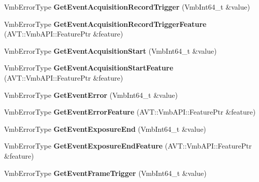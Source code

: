 \begin{DoxyCompactItemize}
\item 
\hypertarget{classMakoCamera_a5e005e9b7efd298aab3a61b2f86d52f3}{Vmb\-Error\-Type {\bfseries Get\-Event\-Acquisition\-Record\-Trigger} (Vmb\-Int64\-\_\-t \&value)}\label{classMakoCamera_a5e005e9b7efd298aab3a61b2f86d52f3}

\item 
\hypertarget{classMakoCamera_a84257ce541d40e3f17103f38a13dbd31}{Vmb\-Error\-Type {\bfseries Get\-Event\-Acquisition\-Record\-Trigger\-Feature} (A\-V\-T\-::\-Vmb\-A\-P\-I\-::\-Feature\-Ptr \&feature)}\label{classMakoCamera_a84257ce541d40e3f17103f38a13dbd31}

\item 
\hypertarget{classMakoCamera_a60fcd0d4942e67c91b2e11f1c16f6d3a}{Vmb\-Error\-Type {\bfseries Get\-Event\-Acquisition\-Start} (Vmb\-Int64\-\_\-t \&value)}\label{classMakoCamera_a60fcd0d4942e67c91b2e11f1c16f6d3a}

\item 
\hypertarget{classMakoCamera_ac1fc9e18c768b4626424d48f04ad92c7}{Vmb\-Error\-Type {\bfseries Get\-Event\-Acquisition\-Start\-Feature} (A\-V\-T\-::\-Vmb\-A\-P\-I\-::\-Feature\-Ptr \&feature)}\label{classMakoCamera_ac1fc9e18c768b4626424d48f04ad92c7}

\item 
\hypertarget{classMakoCamera_a1169f87cbb7c2e0df7f77acf304b6887}{Vmb\-Error\-Type {\bfseries Get\-Event\-Error} (Vmb\-Int64\-\_\-t \&value)}\label{classMakoCamera_a1169f87cbb7c2e0df7f77acf304b6887}

\item 
\hypertarget{classMakoCamera_a066c6295ca4fbbfb7ace4896ba3c8a82}{Vmb\-Error\-Type {\bfseries Get\-Event\-Error\-Feature} (A\-V\-T\-::\-Vmb\-A\-P\-I\-::\-Feature\-Ptr \&feature)}\label{classMakoCamera_a066c6295ca4fbbfb7ace4896ba3c8a82}

\item 
\hypertarget{classMakoCamera_a52b00ca70394a5f77e9427a3ee1ceb8b}{Vmb\-Error\-Type {\bfseries Get\-Event\-Exposure\-End} (Vmb\-Int64\-\_\-t \&value)}\label{classMakoCamera_a52b00ca70394a5f77e9427a3ee1ceb8b}

\item 
\hypertarget{classMakoCamera_a8e5f5406204eeb36b1992904a4f36ff3}{Vmb\-Error\-Type {\bfseries Get\-Event\-Exposure\-End\-Feature} (A\-V\-T\-::\-Vmb\-A\-P\-I\-::\-Feature\-Ptr \&feature)}\label{classMakoCamera_a8e5f5406204eeb36b1992904a4f36ff3}

\item 
\hypertarget{classMakoCamera_a315de5784495345d4f5b35cc57a508fc}{Vmb\-Error\-Type {\bfseries Get\-Event\-Frame\-Trigger} (Vmb\-Int64\-\_\-t \&value)}\label{classMakoCamera_a315de5784495345d4f5b35cc57a508fc}


\end{DoxyCompactItemize}
